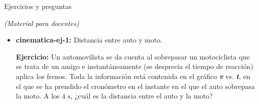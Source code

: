 \documentclass[a4paper,11pt,dvipsnames]{article}
\begin{document}
\thispagestyle{fancy}

\noindent
\begin{center}
{\LARGE \vspace*{0.5cm} Ejercicios y preguntas}\par\medskip \textit{(Material para docentes)}
\end{center}

\vspace{20pt}

\begin{itemize}
 


\item \textbf{cinematica-ej-1:} Distancia entre auto y moto. \par\medskip

  \begin{center}
  \begin{minipage}{0.60\linewidth}
  \textbf{Ejercicio:} Un automovilista se da cuenta al sobrepasar un motociclista que se trata de un amigo e instantáneamente (se desprecia el tiempo de reacción) aplica los frenos. Toda la información está contenida en el gráfico \textbf{\textit{v}} vs. \textbf{\textit{t}}, en el que se ha prendido el cronómetro en el instante en el que el auto sobrepasa la moto. A los $4\text{ s}$, ¿cuál es la distancia entre el auto y la moto?

\begin{center}
\end{center}
\end{minipage}
\end{center}
\end{itemize}
\end{document}
